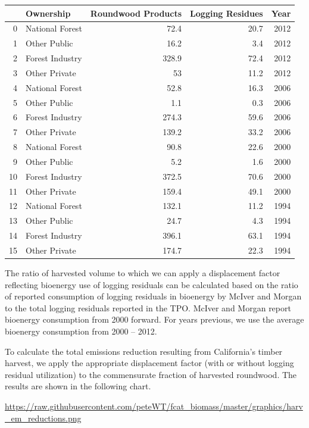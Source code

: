\documentclass[a4paper]{article}
\begin{document}
\begin{center}
\begin{tabular}{rlrrr}
 & Ownership & Roundwood Products & Logging Residues & Year\\
\hline
0 & National Forest & 72.4 & 20.7 & 2012\\
1 & Other Public & 16.2 & 3.4 & 2012\\
2 & Forest Industry & 328.9 & 72.4 & 2012\\
3 & Other Private & 53 & 11.2 & 2012\\
4 & National Forest & 52.8 & 16.3 & 2006\\
5 & Other Public & 1.1 & 0.3 & 2006\\
6 & Forest Industry & 274.3 & 59.6 & 2006\\
7 & Other Private & 139.2 & 33.2 & 2006\\
8 & National Forest & 90.8 & 22.6 & 2000\\
9 & Other Public & 5.2 & 1.6 & 2000\\
10 & Forest Industry & 372.5 & 70.6 & 2000\\
11 & Other Private & 159.4 & 49.1 & 2000\\
12 & National Forest & 132.1 & 11.2 & 1994\\
13 & Other Public & 24.7 & 4.3 & 1994\\
14 & Forest Industry & 396.1 & 63.1 & 1994\\
15 & Other Private & 174.7 & 22.3 & 1994\\
\end{tabular}

\end{center}

The ratio of harvested volume to which we can apply a displacement
factor reflecting bioenergy use of logging residuals can be calculated
based on the ratio of reported consumption of logging residuals in
bioenergy by McIver and Morgan to the total logging residuals reported
in the TPO. McIver and Morgan report bioenergy consumption from 2000
forward. For years previous, we use the average bioenergy consumption
from 2000 -- 2012.

To calculate the total emissions reduction resulting from California's
timber harvest, we apply the appropriate displacement factor (with or
without logging residual utilization) to the commensurate fraction of
harvested roundwood. The results are shown in the following chart.

\url{https://raw.githubusercontent.com/peteWT/fcat_biomass/master/graphics/harv_em_reductions.png}
\end{document}
